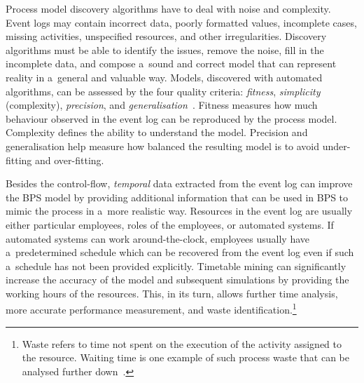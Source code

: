 \documentclass[12pt]{article}
\begin{document}
Process model discovery algorithms have to deal with noise and complexity. Event logs may contain incorrect data, poorly formatted values, incomplete cases, missing activities, unspecified resources, and other irregularities. Discovery algorithms must be able to identify the issues, remove the noise, fill in the incomplete data, and compose a~sound and correct model that can represent reality in a~general and valuable way. Models, discovered with automated algorithms, can be assessed by the four quality criteria: \emph{fitness}, \emph{simplicity} (complexity), \emph{precision}, and \emph{generalisation}~\cite{van_der_aalst_process_2016}. Fitness measures how much behaviour observed in the event log can be reproduced by the process model. Complexity defines the ability to understand the model. Precision and generalisation help measure how balanced the resulting model is to avoid under-fitting and over-fitting.


Besides the control-flow, \emph{temporal} data extracted from the event log can improve the BPS model by providing additional information that can be used in BPS to mimic the process in a~more realistic way. 
Resources in the event log are usually either particular employees, roles of the employees, or automated systems. 
If automated systems can work around-the-clock, employees usually have a~predetermined schedule which can be recovered from the event log even if such a~schedule has not been provided explicitly. 
Timetable mining can significantly increase the accuracy of the model and subsequent simulations by providing the working hours of the resources. 
This, in its turn, allows further time analysis, more accurate performance measurement, and waste identification.\footnote{Waste refers to time not spent on the execution of the activity assigned to the resource. 
Waiting time is one example of such process waste that can be analysed further down~\cite{lashkevich_why_2022}.}
\end{document}
